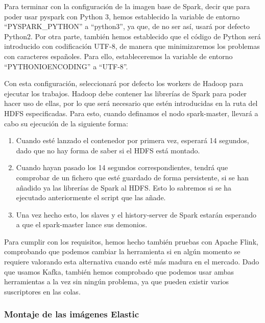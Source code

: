 Para terminar con la configuración de la imagen base de Spark, decir que para poder usar pyspark con Python 3, hemos establecido la variable de entorno “PYSPARK\_PYTHON” a “python3”, ya que, de no ser así, usará por defecto Python2. Por otra parte, también hemos establecido que el código de Python será introducido con codificación UTF-8, de manera que minimizaremos los problemas con caracteres españoles. Para ello, estableceremos la variable de entorno “PYTHONIOENCODING” a “UTF-8”. \par
Con esta configuración, seleccionará por defecto los workers de Hadoop para ejecutar los trabajos. Hadoop debe contener las librerías de Spark para poder hacer uso de ellas, por lo que será necesario que estén introducidas en la ruta del HDFS especificadas. Para esto, cuando definamos el nodo spark-master, llevará a cabo su ejecución de la siguiente forma:\par
\begin{enumerate}
	\item Cuando esté lanzado el contenedor por primera vez, esperará 14 segundos, dado que no hay forma de saber si el HDFS está montado.
	\item Cuando hayan pasado los 14 segundos correspondientes, tendrá que comprobar de un fichero que esté guardado de forma persistente, si se han añadido ya las librerías de Spark al HDFS. Esto lo sabremos si se ha ejecutado anteriormente el script que las añade.
	\item Una vez hecho esto, los slaves y el history-server de Spark estarán esperando a que el spark-master lance sus demonios.
\end{enumerate}
Para cumplir con los requisitos, hemos hecho también pruebas con Apache Flink, comprobando que podemos cambiar la herramienta si en algún momento se requiere valorando esta alternativa cuando esté más madura en el mercado. Dado que usamos Kafka, también hemos comprobado que podemos usar ambas herramientas a la vez sin ningún problema, ya que pueden existir varios suscriptores en las colas.



\subsubsection {Montaje de las imágenes Elastic\label{montElastic}}

